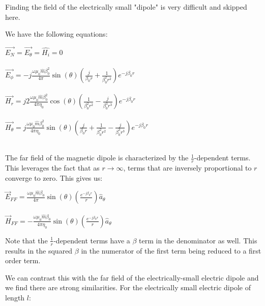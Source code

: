 \documentclass{article}
\begin{document}
Finding the field of the electrically small "dipole" is very difficult and skipped here. 

We have the following equations:

\begin{center}
    $\Vec{E_N} = \Vec{E_\theta} = \hat{H_i} = 0$ \\
    \hspace{0.1} \\
    $\Vec{E_\phi} = -j \frac{\omega \mu_0 \hat{m} \beta_0^2}{4 \pi} \sin(\theta) (\frac{j}{\beta_0 r} + \frac{1}{\beta_0^2 r^2})e^{-j \beta_0 r}$ \\
    \hspace{0.1} \\
    $\Vec{H_r} = j 2 \frac{\omega \mu_0 \hat{m} \beta_0^2}{4 \pi \eta_0} \cos(\theta) (\frac{1}{\beta_0^2 r^2} - \frac{j}{\beta_0^3 r^3})e^{-j \beta_0 r}$ \\
    \hspace{0.1} \\
    $\Vec{H_\theta} = j \frac{\omega \mu_0 \hat{m} \beta_0^2}{4 \pi \eta_0} \sin(\theta) (\frac{j}{\beta_0 r} + \frac{1}{\beta_0^2 r^2} - \frac{j}{\beta_0^3 r^3})e^{-j \beta_0 r}$ \\\\
\end{center}

The far field of the magnetic dipole is characterized by the $\frac{1}{r}$-dependent terms. This leverages the fact that as $r \to \infty$, terms that are inversely proportional to $r$ converge to zero. This gives us:

\begin{center}
    $\Vec{E}_{FF} = \frac{\omega \mu_0 \hat{m} \beta_0}{4 \pi} \sin(\theta) (\frac{e^{-j \beta_0 r}}{ r})\hat{a}_\theta$ \\
    \hspace{0.1} \\
    $\Vec{H}_{FF} = -\frac{\omega \mu_0 \hat{m} \beta_0}{4 \pi \eta_0} \sin(\theta) (\frac{e^{-j \beta_0 r}}{ r})\hat{a}_\theta$ \\
    
\end{center}

Note that the $\frac{1}{r}$-dependent terms have a $\beta$ term in the denominator as well. This results in the squared $\beta$ in the numerator of the first term being reduced to a first order term.

We can contrast this with the far field of the electrically-small electric dipole and we find there are strong similarities. For the electrically small electric dipole of length $l$:
\end{document}
